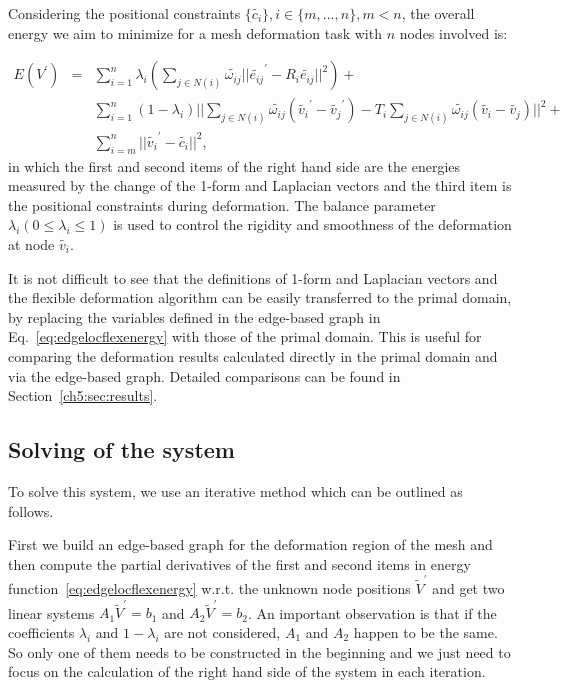 Considering the positional  constraints $\{\tilde{c_i}\},i\in
\{m,...,n\},m<n$, the overall energy we aim to minimize for a mesh
deformation task with $n$ nodes involved is:

\begin{eqnarray}
\label{eq:edgelocflexenergy}
E(V^\prime) &=& \sum\limits_{i=1}^n{\lambda_i(\sum\limits_{j\in N(i)}{\tilde{\omega_{ij}} ||\tilde{e_{ij}}^\prime -R_i \tilde{e_{ij}}||^2})}+\nonumber\\
& & \sum\limits_{i=1}^n{(1-\lambda_i)||\sum\limits_{j\in N(i)}{\tilde{\omega_{ij}}(\tilde{v_i}^\prime - \tilde{v_j}^\prime)} -T_i\sum\limits_{j\in N(i)}{\tilde{\omega_{ij}}(\tilde{v_i} - \tilde{v_j})}||^2}+\nonumber\\
& &\sum\limits_{i=m}^n{||\tilde{v_i}^\prime-\tilde{c_i}||^2},
\end{eqnarray}
in which the first and second  items of the right hand side are the
energies measured by the change of the 1-form and Laplacian vectors
and the third item is the positional constraints during deformation.
The balance parameter $\lambda_i (0\leq \lambda_i\leq 1)$ is used to
control the rigidity and smoothness of the deformation at node
$\tilde{v_i}$.

It is not difficult to see that the definitions  of 1-form and
Laplacian vectors and the flexible deformation algorithm can be
easily transferred to the primal domain, by replacing the variables
defined in the edge-based graph in Eq.~\ref{eq:edgelocflexenergy}
with those of the primal domain. This is useful for comparing the
deformation results calculated directly in the primal domain and via
the edge-based graph. Detailed comparisons can be found in
Section~\ref{ch5:sec:results}.


\subsection{Solving of the system} To solve this system, we use an
iterative method  which can be outlined as follows.

First we build an edge-based graph for the  deformation region of
the mesh and then compute the partial derivatives of the first and
second items in energy function~\ref{eq:edgelocflexenergy} w.r.t.
the unknown node positions $\tilde{V}^\prime$ and get two linear
systems $A_1\tilde{V}^\prime=b_1$ and $A_2\tilde{V}^\prime=b_2$. An
important observation is that if the coefficients $\lambda_i$ and
$1-\lambda_i$ are not considered, $A_1$ and $A_2$ happen to be the
same. So only one of them needs to be constructed in the beginning
and we just need to focus on the calculation of the right hand side
of the system in each iteration.

